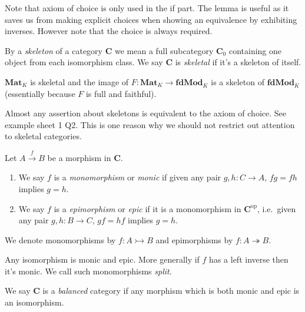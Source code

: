 \documentclass[a4paper]{article}
\renewcommand{\c}[1]{\mathbf{#1}}
\newcommand{\mono}{\rightarrowtail}
\newcommand{\epi}{\twoheadrightarrow}
\begin{document}
Note that axiom of choice is only used in the if part. The lemma is useful as it saves us from making explicit choices when showing an equivalence by exhibiting inverses. However note that the choice is always required.

\begin{definition}[skeleton]
  By a \emph{skeleton} of a category \(\c C\) we mean a full subcategory \(\c C_0\) containing one object from each isomorphism class. We say \(\c C\) is \emph{skeletal} if it's a skeleton of itself.
\end{definition}

\begin{eg}
  \(\c{Mat}_K\) is skeletal and the image of \(F: \c{Mat}_K \to \c{fdMod}_K\) is a skeleton of \(\c{fdMod}_K\) (essentially because \(F\) is full and faithful).
\end{eg}

\begin{remark}
  Almost any assertion about skeletons is equivalent to the axiom of choice. See example sheet 1 Q2. This is one reason why we should not restrict out attention to skeletal categories.
\end{remark}

\begin{definition}
  Let \(A \xrightarrow{f} B\) be a morphism in \(\c C\).
  \begin{enumerate}
  \item We say \(f\) is a \emph{monomorphism} or \emph{monic} if given any pair \(g, h: C \to A\), \(fg = fh\) implies \(g = h\).
  \item We say \(f\) is a \emph{epimorphism} or \emph{epic} if it is a monomorphism in \(\c C^{\text{op}}\), i.e.\ given any pair \(g, h: B \to C\), \(gf = hf\) implies \(g = h\).
  \end{enumerate}

  We denote monomorphisms by \(f: A \mono B\) and epimorphisms by \(f: A \epi B\).
\end{definition}

Any isomorphism is monic and epic. More generally if \(f\) has a left inverse then it's monic. We call such monomorphisms \emph{split}.

\begin{definition}[balanced]
  We say \(\c C\) is a \emph{balanced} category if any morphism which is both monic and epic is an isomorphism.
\end{definition}
\end{document}
